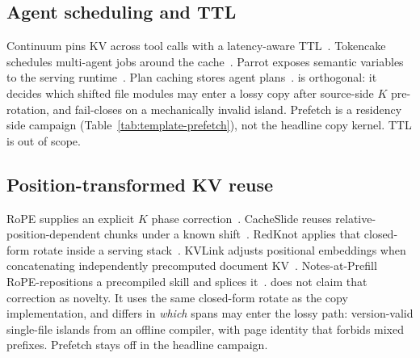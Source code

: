 \subsection{Agent scheduling and TTL}

Continuum pins KV across tool calls with a latency-aware
TTL~\cite{continuum}. Tokencake schedules multi-agent jobs around the
cache~\cite{tokencake2025}. Parrot exposes semantic variables to the
serving runtime~\cite{parrot2024}. Plan caching stores agent
plans~\cite{plancaching2026}. \method{} is orthogonal: it decides which shifted file modules may
enter a lossy copy after source-side $K$ pre-rotation, and fail-closes
on a mechanically invalid island. Prefetch is a residency side campaign
(Table~\ref{tab:template-prefetch}), not the headline copy kernel. TTL
is out of scope.

\subsection{Position-transformed KV reuse}

RoPE supplies an explicit $K$ phase correction~\cite{su2021roformer}.
CacheSlide reuses relative-position-dependent chunks under a known
shift~\cite{liu2026cacheslide}. RedKnot applies that closed-form
rotate inside a serving stack~\cite{liu2026redknot}. KVLink adjusts
positional embeddings when concatenating independently precomputed
document KV~\cite{yang2025kvlink}. Notes-at-Prefill RoPE-repositions a
precompiled skill and splices it~\cite{li2026notes}.
\method{} does not claim that correction as novelty. It uses the same
closed-form rotate as the copy implementation, and differs in
\emph{which} spans may enter the lossy path: version-valid single-file
islands from an offline compiler, with page identity that forbids mixed
prefixes. Prefetch stays off in the headline campaign.
